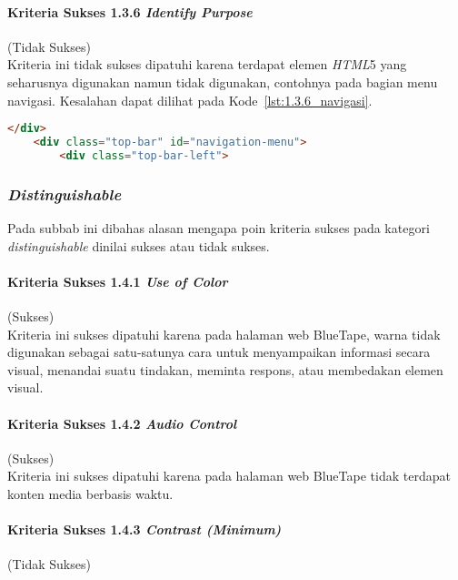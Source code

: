 \paragraph{Kriteria Sukses 1.3.6 \textit{Identify Purpose}}
\label{par:kepatuhan_bluetape_kriteria_sukses_1.3.6}
(Tidak Sukses)\\

Kriteria ini tidak sukses dipatuhi karena terdapat elemen \textit{HTML}5 yang seharusnya digunakan namun tidak digunakan, contohnya pada bagian menu navigasi. Kesalahan dapat dilihat pada \mbox{Kode \ref{lst:1.3.6_navigasi}}.

\begin{lstlisting}[frame=single, label={lst:1.3.6_navigasi}, language=HTML, caption=Pelanggaran Kriteria Sukses 1.3.6 pada Menu Navigasi]
    </div>
    <div class="top-bar" id="navigation-menu">
        <div class="top-bar-left">
\end{lstlisting}

\subsubsection{\textit{Distinguishable}}
\label{subsubsec:kepatuhan_bluetape_distinguishable}
Pada subbab ini dibahas alasan mengapa poin kriteria sukses pada kategori \textit{distinguishable} dinilai sukses atau tidak sukses.

\paragraph{Kriteria Sukses 1.4.1 \textit{Use of Color}}
\label{par:kepatuhan_bluetape_kriteria_sukses_1.4.1}
(Sukses)\\

Kriteria ini sukses dipatuhi karena pada halaman web BlueTape, warna tidak digunakan sebagai satu-satunya cara untuk menyampaikan informasi secara visual, menandai suatu tindakan, meminta respons, atau membedakan elemen visual.

\paragraph{Kriteria Sukses 1.4.2 \textit{Audio Control}}
\label{par:kepatuhan_bluetape_kriteria_sukses_1.4.2}
(Sukses)\\

Kriteria ini sukses dipatuhi karena pada halaman web BlueTape tidak terdapat konten media berbasis waktu.

\paragraph{Kriteria Sukses 1.4.3 \textit{Contrast (Minimum)}}
\label{par:kepatuhan_bluetape_kriteria_sukses_1.4.3}
(Tidak Sukses)\\

